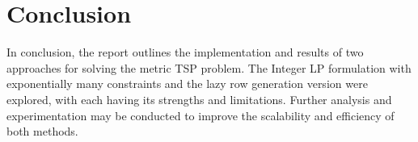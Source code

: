 \section*{Conclusion}

In conclusion, the report outlines the implementation and results of two approaches for solving the metric TSP problem. The Integer LP formulation with exponentially many constraints and the lazy row generation version were explored, with each having its strengths and limitations. Further analysis and experimentation may be conducted to improve the scalability and efficiency of both methods.


